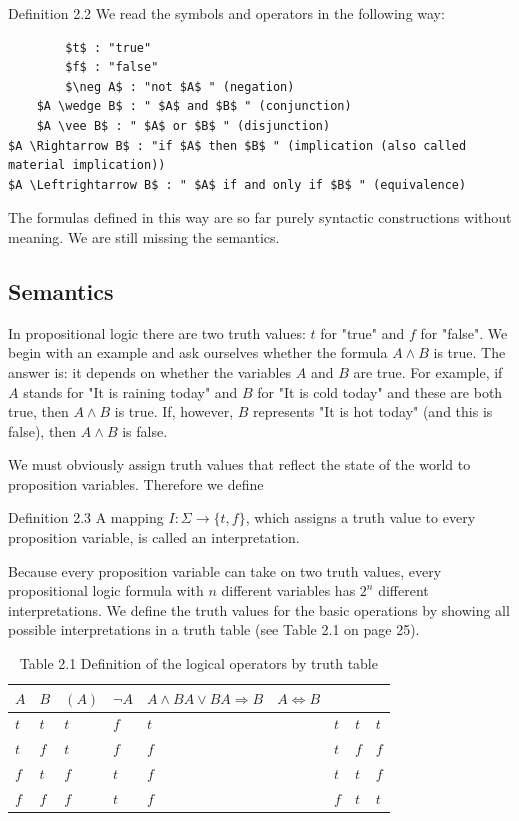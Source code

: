 \documentclass[10pt]{book}
\begin{document}
Definition 2.2 We read the symbols and operators in the following way:

\begin{verbatim}
        $t$ : "true"
        $f$ : "false"
        $\neg A$ : "not $A$ " (negation)
    $A \wedge B$ : " $A$ and $B$ " (conjunction)
    $A \vee B$ : " $A$ or $B$ " (disjunction)
$A \Rightarrow B$ : "if $A$ then $B$ " (implication (also called material implication))
$A \Leftrightarrow B$ : " $A$ if and only if $B$ " (equivalence)
\end{verbatim}

The formulas defined in this way are so far purely syntactic constructions without meaning. We are still missing the semantics.

\subsection*{Semantics}
In propositional logic there are two truth values: $t$ for "true" and $f$ for "false". We begin with an example and ask ourselves whether the formula $A \wedge B$ is true. The answer is: it depends on whether the variables $A$ and $B$ are true. For example, if $A$ stands for "It is raining today" and $B$ for "It is cold today" and these are both true, then $A \wedge B$ is true. If, however, $B$ represents "It is hot today" (and this is false), then $A \wedge B$ is false.

We must obviously assign truth values that reflect the state of the world to proposition variables. Therefore we define

Definition 2.3 A mapping $I: \Sigma \rightarrow\{t, f\}$, which assigns a truth value to every proposition variable, is called an interpretation.

Because every proposition variable can take on two truth values, every propositional logic formula with $n$ different variables has $2^{n}$ different interpretations. We define the truth values for the basic operations by showing all possible interpretations in a truth table (see Table 2.1 on page 25).

\begin{table}[htbp]
\begin{center}
\captionsetup{labelformat=empty}
\caption{Table 2.1 Definition of the logical operators by truth table}
\begin{tabular}{llllllll}
\hline
$A$ & $B$ & $(A)$ & $\neg A$ & $A \wedge B A \vee B A \Rightarrow B \quad A \Leftrightarrow B$ &  &  &  \\

\hline
$t$ & $t$ & $t$ & $f$ & $t$ & $t$ & $t$ & $t$ \\
\hline
$t$ & $f$ & $t$ & $f$ & $f$ & $t$ & $f$ & $f$ \\
\hline
$f$ & $t$ & $f$ & $t$ & $f$ & $t$ & $t$ & $f$ \\
\hline
$f$ & $f$ & $f$ & $t$ & $f$ & $f$ & $t$ & $t$ \\
\hline
\end{tabular}
\end{center}
\end{table}
\end{document}
